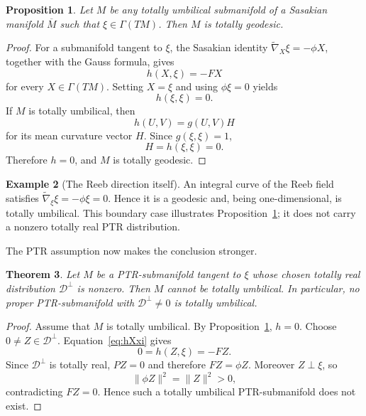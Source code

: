 \documentclass[11pt]{article}
\newtheorem{theorem}{Theorem}[section]\newtheorem{proposition}[theorem]{Proposition}
\theoremstyle{definition}\newtheorem{definition}[theorem]{Definition}\newtheorem{example}[theorem]{Example}
\theoremstyle{remark}\newtheorem{remark}[theorem]{Remark}
\newcommand{\Mbar}{\overline M}\newcommand{\Dperp}{\mathcal D^{\perp}}\newcommand{\Dtilde}{\widetilde{\mathcal D}}
\begin{document}
\begin{proposition}\label{prop:umbilical-geodesic}
Let \(M\) be any totally umbilical submanifold of a Sasakian manifold
\(\Mbar\) such that \(\xi\in\Gamma(TM)\).  Then \(M\) is totally geodesic.
\end{proposition}

\begin{proof}
For a submanifold tangent to \(\xi\), the Sasakian identity
\(\widetilde\nabla_X\xi=-\phi X\), together with the Gauss formula, gives
\begin{equation}\label{eq:hXxi}
 h(X,\xi)=-FX
\end{equation}
for every \(X\in\Gamma(TM)\).  Setting \(X=\xi\) and using
\(\phi\xi=0\) yields
\[
 h(\xi,\xi)=0.
\]
If \(M\) is totally umbilical, then
\[
 h(U,V)=g(U,V)H
\]
for its mean curvature vector \(H\).  Since \(g(\xi,\xi)=1\),
\[
 H=h(\xi,\xi)=0.
\]
Therefore \(h=0\), and \(M\) is totally geodesic.
\end{proof}

\begin{example}[The Reeb direction itself]\label{ex:umbilical-reeb}
An integral curve of the Reeb field satisfies
\(\widetilde\nabla_\xi\xi=-\phi\xi=0\).  Hence it is a geodesic and,
being one-dimensional, is totally umbilical.  This boundary case
illustrates Proposition~\ref{prop:umbilical-geodesic}; it does not carry a
nonzero totally real PTR distribution.
\end{example}

The PTR assumption now makes the conclusion stronger.

\begin{theorem}\label{thm:no-umbilical-ptr}
Let \(M\) be a PTR-submanifold tangent to \(\xi\) whose chosen totally
real distribution \(\Dperp\) is nonzero.  Then \(M\) cannot be totally
umbilical.  In particular, no proper PTR-submanifold with
\(\Dperp\neq0\) is totally umbilical.
\end{theorem}

\begin{proof}
Assume that \(M\) is totally umbilical.  By
Proposition~\ref{prop:umbilical-geodesic}, \(h=0\).  Choose
\(0\neq Z\in\Dperp\).  Equation~\eqref{eq:hXxi} gives
\[
 0=h(Z,\xi)=-FZ.
\]
Since \(\Dperp\) is totally real, \(PZ=0\) and therefore
\(FZ=\phi Z\).  Moreover \(Z\perp\xi\), so
\[
 \|\phi Z\|^2=\|Z\|^2>0,
\]
contradicting \(FZ=0\).  Hence such a totally umbilical PTR-submanifold
does not exist.
\end{proof}
\end{document}
